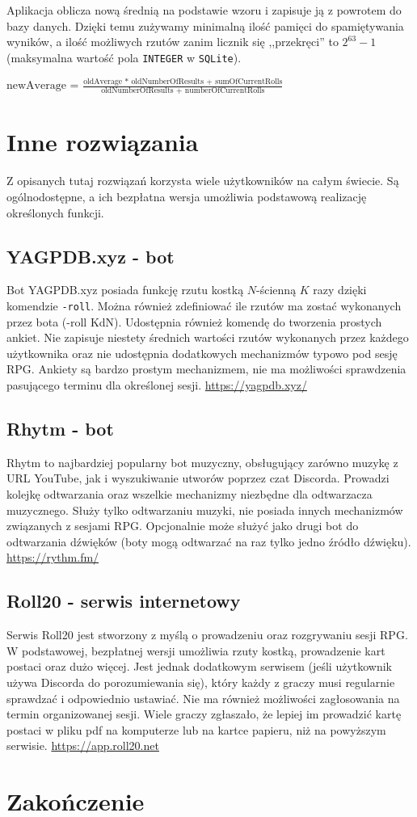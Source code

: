 \documentclass[shortabstract,inz]{iithesis}
\begin{document}
			Aplikacja oblicza nową średnią na podstawie wzoru i zapisuje ją z powrotem do bazy danych. Dzięki temu zużywamy minimalną ilość pamięci do spamiętywania wyników, a ilość możliwych rzutów zanim licznik się ,,przekręci'' to \(2^{63} - 1\) (maksymalna wartość pola \texttt{INTEGER} w \texttt{SQLite}).
			
			\begin{center}
				\(\textrm{newAverage = } \frac{\textrm{oldAverage * oldNumberOfResults + sumOfCurrentRolls}}{\textrm{oldNumberOfResults + numberOfCurrentRolls}}\)
			\end{center}		
		
	\chapter{Inne rozwiązania}	
		Z opisanych tutaj rozwiązań korzysta wiele użytkowników na całym świecie. Są ogólnodostępne, a ich bezpłatna wersja umożliwia podstawową realizację określonych funkcji. 
		\section{YAGPDB.xyz - bot}
		Bot YAGPDB.xyz posiada funkcję rzutu kostką \(N\)-ścienną \(K\) razy dzięki komendzie \texttt{-roll}. Można również zdefiniować ile rzutów ma zostać wykonanych przez bota (-roll KdN). Udostępnia również komendę do tworzenia prostych ankiet. Nie zapisuje niestety średnich wartości rzutów wykonanych przez każdego użytkownika oraz nie udostępnia dodatkowych mechanizmów typowo pod sesję RPG. Ankiety są bardzo prostym mechanizmem, nie ma możliwości sprawdzenia pasującego terminu dla określonej sesji. \url{https://yagpdb.xyz/}
		\section{Rhytm - bot}
		Rhytm to najbardziej popularny bot muzyczny, obsługujący zarówno muzykę z URL YouTube, jak i wyszukiwanie utworów poprzez czat Discorda. Prowadzi kolejkę odtwarzania oraz wszelkie mechanizmy niezbędne dla odtwarzacza muzycznego. Służy tylko odtwarzaniu muzyki, nie posiada innych mechanizmów związanych z sesjami RPG. Opcjonalnie może służyć jako drugi bot do odtwarzania dźwięków (boty mogą odtwarzać na raz tylko jedno źródło dźwięku). \url{https://rythm.fm/}
		\section{Roll20 - serwis internetowy}
		Serwis Roll20 jest stworzony z myślą o prowadzeniu oraz rozgrywaniu sesji RPG. W podstawowej, bezpłatnej wersji umożliwia rzuty kostką, prowadzenie kart postaci oraz dużo więcej. Jest jednak dodatkowym serwisem (jeśli użytkownik używa Discorda do porozumiewania się), który każdy z graczy musi regularnie sprawdzać i odpowiednio ustawiać. Nie ma również możliwości zagłosowania na termin organizowanej sesji. Wiele graczy zgłaszało, że lepiej im prowadzić kartę postaci w pliku pdf na komputerze lub na kartce papieru, niż na powyższym serwisie. \url{https://app.roll20.net}
		
	\chapter{Zakończenie}
	
	\printbibliography[title=Bibliografia]
\end{document}

